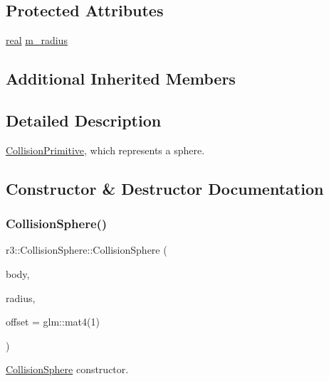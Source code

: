 \subsection*{Protected Attributes}
\begin{DoxyCompactItemize}
\item 
\mbox{\hyperlink{namespacer3_ab2016b3e3f743fb735afce242f0dc1eb}{real}} \mbox{\hyperlink{classr3_1_1_collision_sphere_abc9e3dcae422b4732a288fa19d89d466}{m\+\_\+radius}}
\end{DoxyCompactItemize}
\subsection*{Additional Inherited Members}


\subsection{Detailed Description}
\mbox{\hyperlink{classr3_1_1_collision_primitive}{Collision\+Primitive}}, which represents a sphere. 

\subsection{Constructor \& Destructor Documentation}
\mbox{\label{classr3_1_1_collision_sphere_a3b910b66d6b9689da9beba5ec151eba3}} 
\subsubsection{\texorpdfstring{Collision\+Sphere()}{CollisionSphere()}}
{\footnotesize\ttfamily r3\+::\+Collision\+Sphere\+::\+Collision\+Sphere (\begin{DoxyParamCaption}\item[{\mbox{\hyperlink{classr3_1_1_rigid_body}{Rigid\+Body}} $\ast$}]{body,  }\item[{\mbox{\hyperlink{namespacer3_ab2016b3e3f743fb735afce242f0dc1eb}{real}}}]{radius,  }\item[{const glm\+::mat4 \&}]{offset = {\ttfamily glm\+:\+:mat4(1)} }\end{DoxyParamCaption})}



\mbox{\hyperlink{classr3_1_1_collision_sphere}{Collision\+Sphere}} constructor. 



